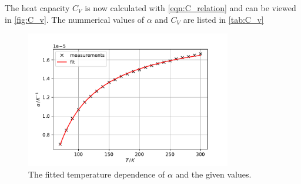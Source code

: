 The heat capacity $C_V$ is now calculated with \autoref{eqn:C_relation} and can be viewed in \autoref{fig:C_v}.
The nummerical values of $\alpha$ and $C_V$ are listed in \autoref{tab:C_v}
\begin{figure}
    \centering
    \includegraphics[width=0.8\textwidth]{content/plots/temperature_progress.pdf}
    \caption{The fitted temperature dependence of $\alpha$ and the given values.}
    \label{fig:alpha}
\end{figure}
